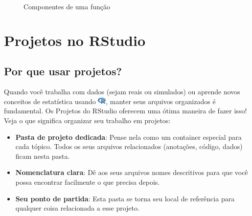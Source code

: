 \documentclass[
  letterpaper,
]{book}
\theoremstyle{definition}
\theoremstyle{plain}
\theoremstyle{remark}
\begin{document}
\begin{figure}


\caption{\label{fig-function-components}Componentes de uma função}

\end{figure}%

\section{Projetos no RStudio}\label{projetos-no-rstudio}

\subsection{Por que usar projetos?}\label{por-que-usar-projetos}

Quando você trabalha com dados (sejam reais ou simulados) ou aprende
novos conceitos de estatística usando
\includegraphics[width=1.13em,height=1em]{getting_started_with_r_files/figure-pdf/fa-icon-9b00320707d42527dde67262afb33ded.pdf},
manter seus arquivos organizados é fundamental. Os Projetos do RStudio
oferecem uma ótima maneira de fazer isso! Veja o que significa organizar
seu trabalho em projetos:

\begin{itemize}
\item
  \textbf{Pasta de projeto dedicada}: Pense nela como um container
  especial para cada tópico. Todos os seus arquivos relacionados
  (anotações, código, dados) ficam nesta pasta.
\item
  \textbf{Nomenclatura clara}: Dê aos seus arquivos nomes descritivos
  para que você possa encontrar facilmente o que precisa depois.
\item
  \textbf{Seu ponto de partida}: Esta pasta se torna seu local de
  referência para qualquer coisa relacionada a esse projeto.
\end{itemize}
\end{document}
